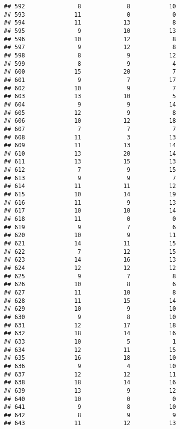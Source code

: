 \documentclass[
]{article}
\begin{document}
\begin{verbatim}
## 592               8             8           10
## 593              11             0            0
## 594              11            13            8
## 595               9            10           13
## 596              10            12            8
## 597               9            12            8
## 598               8             9           12
## 599               8             9            4
## 600              15            20            7
## 601               9             7           17
## 602              10             9            7
## 603              13            10            5
## 604               9             9           14
## 605              12             9            8
## 606              10            12           18
## 607               7             7            7
## 608              11             3           13
## 609              11            13           14
## 610              13            20           14
## 611              13            15           13
## 612               7             9           15
## 613               9             9            7
## 614              11            11           12
## 615              10            14           19
## 616              11             9           13
## 617              10            10           14
## 618              11             0            0
## 619               9             7            6
## 620              10             9           11
## 621              14            11           15
## 622               7            12           15
## 623              14            16           13
## 624              12            12           12
## 625               9             7            8
## 626              10             8            6
## 627              11            10            8
## 628              11            15           14
## 629              10             9           10
## 630               9             8           10
## 631              12            17           18
## 632              18            14           16
## 633              10             5            1
## 634              12            11           15
## 635              16            18           10
## 636               9             4           10
## 637              12            12           11
## 638              18            14           16
## 639              13             9           12
## 640              10             0            0
## 641               9             8           10
## 642               8             9            9
## 643              11            12           13

\end{verbatim}
\end{document}
